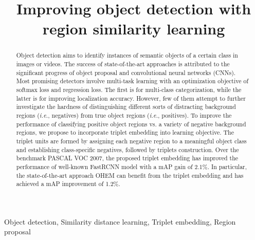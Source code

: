 \documentclass{article}
\begin{document}
\sloppy

\def\x{{\mathbf x}}
\def\L{{\cal L}}


\title{Improving object detection with region similarity learning}


\address{
$^{1}$National Engineering Lab for Video Technology, Peking University, Beijing, China \\
$^{2}$SECE of Shenzhen Graduate School, Peking University, Shenzhen, China \\
$^{3}$Rapid-Rich Object Search Laboratory, Nanyang Technological University, Singapore\\}
\maketitle
\begin{abstract}
Object detection aims to identify instances of semantic objects of a certain class in images or videos. The success of state-of-the-art approaches is attributed to the significant progress of object proposal and convolutional neural networks (CNNs). Most promising detectors involve multi-task learning with an optimization objective of softmax loss and regression loss. The first is for multi-class categorization, while the latter is for improving localization accuracy. However, few of them attempt to further investigate the hardness of distinguishing different sorts of distracting background regions (\textit{i.e.}, negatives) from true object regions (\textit{i.e.}, positives). To improve the performance of classifying positive object regions vs. a variety of negative background regions, we propose to incorporate triplet embedding into learning objective. The triplet units are formed by assigning each negative region to a meaningful object class and establishing class-specific negatives, followed by triplets construction. Over the benchmark PASCAL VOC 2007, the proposed triplet embedding has improved the performance of well-known FastRCNN model with a mAP gain of 2.1\%. In particular, the state-of-the-art approach OHEM can benefit from the triplet embedding and has achieved a mAP improvement of 1.2\%.
\end{abstract}
%
\begin{keywords}
Object detection, Similarity distance learning, Triplet embedding, Region proposal
\end{keywords}
%
\vspace{-10pt}
\end{document}
